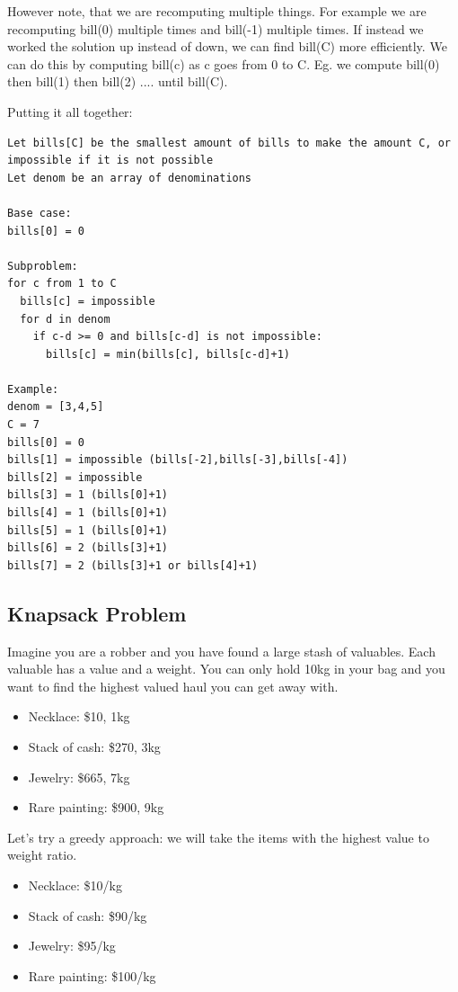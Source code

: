 \documentclass[11pt,oneside]{book}
\begin{document}
However note, that we are recomputing multiple things. For example we are recomputing bill(0) multiple times and bill(-1) multiple times. If instead we worked the solution up instead of down, we can find bill(C) more efficiently. We can do this by computing bill(c) as c goes from 0 to C. Eg. we compute bill(0) then bill(1) then bill(2) .... until bill(C).

Putting it all together:

\begin{lstlisting}
Let bills[C] be the smallest amount of bills to make the amount C, or impossible if it is not possible
Let denom be an array of denominations

Base case:
bills[0] = 0

Subproblem:
for c from 1 to C
  bills[c] = impossible
  for d in denom
    if c-d >= 0 and bills[c-d] is not impossible:
      bills[c] = min(bills[c], bills[c-d]+1)

Example:
denom = [3,4,5]
C = 7
bills[0] = 0
bills[1] = impossible (bills[-2],bills[-3],bills[-4])
bills[2] = impossible 
bills[3] = 1 (bills[0]+1)
bills[4] = 1 (bills[0]+1)
bills[5] = 1 (bills[0]+1)
bills[6] = 2 (bills[3]+1)
bills[7] = 2 (bills[3]+1 or bills[4]+1)
\end{lstlisting}

\subsection{Knapsack Problem}

Imagine you are a robber and you have found a large stash of valuables. Each valuable has a value and a weight. You can only hold 10kg in your bag and you want to find the highest valued haul you can get away with.

\begin{itemize}
\item Necklace: \$10, 1kg
\item Stack of cash: \$270, 3kg
\item Jewelry: \$665, 7kg
\item Rare painting: \$900, 9kg
\end{itemize}

Let's try a greedy approach: we will take the items with the highest value to weight ratio.

\begin{itemize}
\item Necklace: \$10/kg
\item Stack of cash: \$90/kg
\item Jewelry: \$95/kg
\item Rare painting: \$100/kg
\end{itemize}
\end{document}
